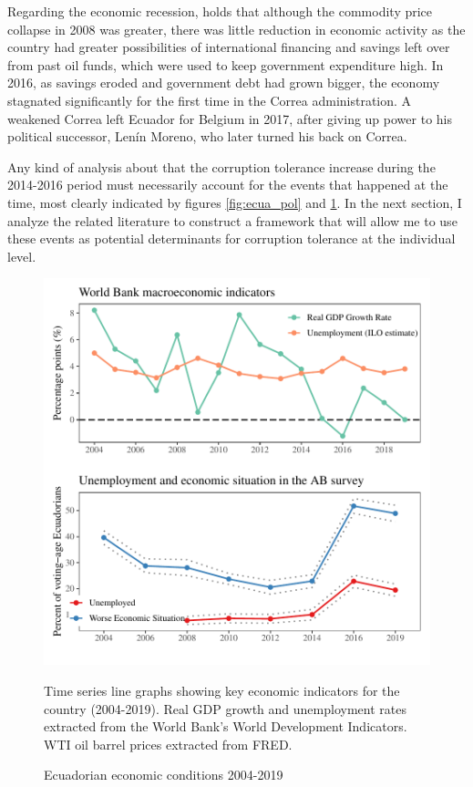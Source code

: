 \documentclass[12pt,a4]{article}
\makeatletter
\def\maxwidth{ %
  \ifdim\Gin@nat@width>\linewidth
    \linewidth
  \else
    \Gin@nat@width
  \fi
}
\newenvironment{knitrout}{}{} %
\makeatother
\begin{document}
Regarding the economic recession, \textcite{Orozco.2015} holds that although the commodity price collapse in 2008 was greater, there was little reduction in economic activity as the country had greater possibilities of international financing and savings left over from past oil funds, which were used to keep government expenditure high. In 2016, as savings eroded and government debt had grown bigger, the economy stagnated significantly for the first time in the Correa administration. A weakened Correa left Ecuador for Belgium in 2017, after giving up power to his political successor, Lenín Moreno, who later turned his back on Correa.

Any kind of analysis about that the corruption tolerance increase during the 2014-2016 period must necessarily account for the events that happened at the time, most clearly indicated by figures \ref{fig:ecua_pol} and \ref{fig:ecua_ec}. In the next section, I analyze the related literature to construct a framework that will allow me to use these events as potential determinants for corruption tolerance at the individual level. 


\begin{figure}[htbp!]
\begin{knitrout}
\color{fgcolor}

{\centering \includegraphics[width=\maxwidth]{figure/econ_graph-1} 

}


\end{knitrout}
\caption{Ecuadorian economic conditions 2004-2019}
\label{fig:ecua_ec}
Time series line graphs showing key economic indicators for the country (2004-2019). Real GDP growth and unemployment rates extracted from the World Bank's World Development Indicators. WTI oil barrel prices extracted from FRED.
\end{figure}
\end{document}
